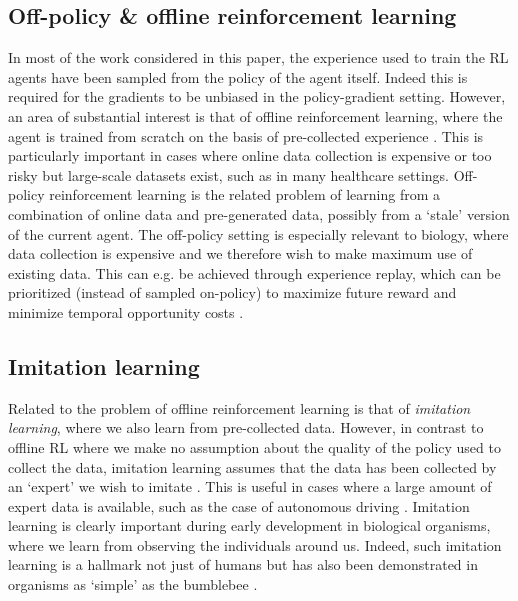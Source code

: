 \subsection{Off-policy \& offline reinforcement learning}
\label{sec:off-policy}
In most of the work considered in this paper, the experience used to train the RL agents have been sampled from the policy of the agent itself.
Indeed this is required for the gradients to be unbiased in the policy-gradient setting.
However, an area of substantial interest is that of offline reinforcement learning, where the agent is trained from scratch on the basis of pre-collected experience \citep{levine2020offline}.
This is particularly important in cases where online data collection is expensive or too risky but large-scale datasets exist, such as in many healthcare settings.
Off-policy reinforcement learning is the related problem of learning from a combination of online data and pre-generated data, possibly from a `stale' version of the current agent.
The off-policy setting is especially relevant to biology, where data collection is expensive and we therefore wish to make maximum use of existing data.
This can e.g. be achieved through experience replay, which can be prioritized (instead of sampled on-policy) to maximize future reward and minimize temporal opportunity costs \citep{mattar2018prioritized, agrawal2022temporal,schaul2015prioritized}.

\subsection{Imitation learning}
\label{sec:imitation}
Related to the problem of offline reinforcement learning is that of \emph{imitation learning}, where we also learn from pre-collected data.
However, in contrast to offline RL where we make no assumption about the quality of the policy used to collect the data, imitation learning assumes that the data has been collected by an `expert' we wish to imitate \citep{levine2020offline}.
This is useful in cases where a large amount of expert data is available, such as the case of autonomous driving \citep{pan2017agile}.
Imitation learning is clearly important during early development in biological organisms, where we learn from observing the individuals around us.
Indeed, such imitation learning is a hallmark not just of humans but has also been demonstrated in organisms as `simple' as the bumblebee \citep{loukola2017bumblebees}.

